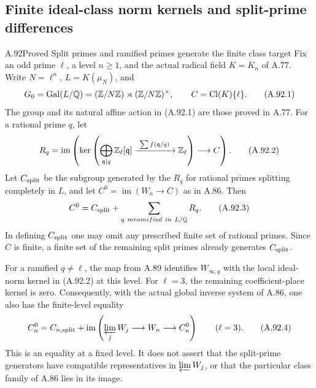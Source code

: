 \subsection{Finite ideal-class norm kernels and split-prime differences}

\begin{statement}{A.92}{Proved}
{Split primes and ramified primes generate the finite class target}
Fix an odd prime $\ell$, a level $n\ge1$, and the actual radical
field $K=K_n$ of A.77.  Write $N=\ell^n$, $L=K(\mu_N)$, and
\[
 G_0=\operatorname{Gal}(L/\mathbb Q)
       =(\mathbb Z/N\mathbb Z)\rtimes(\mathbb Z/N\mathbb Z)^\times,
 \qquad C=\operatorname{Cl}(K)\{\ell\}.
 \tag{A.92.1}
\]
The group and its natural affine action in (A.92.1) are those
proved in A.77.  For a rational prime $q$, let
\[
 R_q=\operatorname{im}\left(
  \ker\left(\bigoplus_{\mathfrak q\mid q}\mathbb Z_\ell[\mathfrak q]
       \xrightarrow{\ \sum f(\mathfrak q/q)\ }\mathbb Z_\ell\right)
       \longrightarrow C\right).
 \tag{A.92.2}
\]
Let $C_{\rm split}$ be the subgroup generated by the $R_q$ for
rational primes splitting completely in $L$, and let
$C^0=\operatorname{im}(W_n\to C)$ as in A.86.  Then
\[
 C^0=C_{\rm split}
       +\sum_{q\ {
m ramified\ in}\ L/\mathbb Q}R_q.
 \tag{A.92.3}
\]
In defining $C_{\rm split}$ one may omit any prescribed finite
set of rational primes.  Since $C$ is finite, a finite set of
the remaining split primes already generates $C_{\rm split}$.

For a ramified $q\ne\ell$, the map from A.89 identifies
$W_{\infty,q}$ with the local ideal-norm kernel in (A.92.2)
at this level.  For $\ell=3$, the remaining coefficient-place
kernel is zero.  Consequently, with the actual global inverse
system of A.86, one also has the finite-level equality
\[
 C_n^0=C_{n,\rm split}
       +\operatorname{im}\left(
          \varprojlim_jW_j\longrightarrow W_n\longrightarrow C_n^0
                            \right)\qquad(\ell=3).
 \tag{A.92.4}
\]
This is an equality at a fixed level.  It does not assert that
the split-prime generators have compatible representatives in
$\varprojlim W_j$, or that the particular class family of A.86
lies in its image.
\end{statement}
